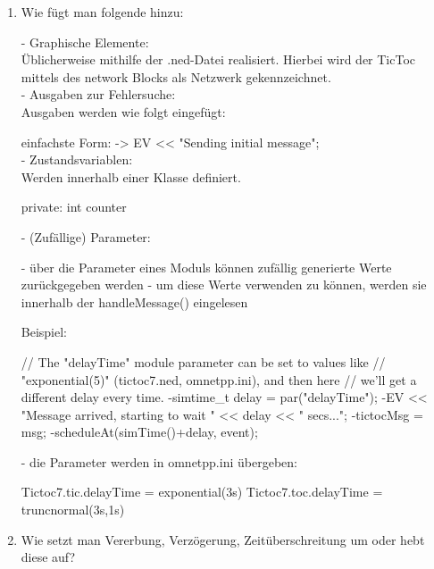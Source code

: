 \documentclass[11pt]{article}
\begin{document}
\begin{enumerate}[\thesubsection .1]
        \item Wie fügt man folgende hinzu:
        \begin{addmargin}[1em]{1em}
            - Graphische Elemente: \\

            Üblicherweise mithilfe der .ned-Datei realisiert.
            Hierbei wird der TicToc mittels des network Blocks als Netzwerk
            gekennzeichnet.\\

            - Ausgaben zur Fehlersuche: \\

            Ausgaben werden wie folgt eingefügt:

            einfachste Form:
            -> EV << "Sending initial message";\\



            - Zustandsvariablen: \\

            Werden innerhalb einer Klasse definiert.

            private:
            int counter

            - (Zufällige) Parameter:

            - über die Parameter eines Moduls können zufällig
            generierte Werte zurückgegeben werden
            - um diese Werte verwenden zu können, werden sie innerhalb der
            handleMessage() eingelesen

            Beispiel:

            // The "delayTime" module parameter can be set to values like
            // "exponential(5)" (tictoc7.ned, omnetpp.ini), and then here
            // we'll get a different delay every time.
            -simtime_t delay = par("delayTime");
            -EV << "Message arrived, starting to wait " << delay << " secs...\n";
            -tictocMsg = msg;
            -scheduleAt(simTime()+delay, event);

            - die Parameter werden in omnetpp.ini übergeben:

            Tictoc7.tic.delayTime = exponential(3s)
            Tictoc7.toc.delayTime = truncnormal(3s,1s)

        \end{addmargin}


        \item Wie setzt man Vererbung, Verzögerung, Zeitüberschreitung um oder hebt diese auf?\\



\end{enumerate}
\end{document}
